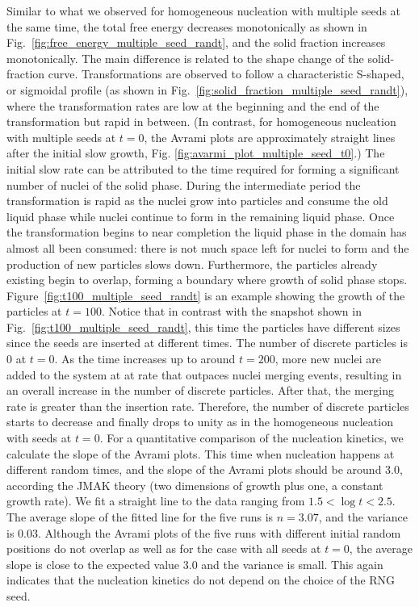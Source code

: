 \documentclass[preprint,12pt]{elsarticle}
\begin{document}
Similar to what we observed for homogeneous nucleation with multiple seeds at the same time, the total free energy decreases monotonically as shown in Fig.~\ref{fig:free_energy_multiple_seed_randt}, and the solid fraction increases monotonically. The main difference %
is related to the shape change of the solid-fraction curve. Transformations are observed to follow a characteristic S-shaped, or sigmoidal profile (as shown in  Fig.~\ref{fig:solid_fraction_multiple_seed_randt}), where the transformation rates are low at the beginning and the end of the transformation but rapid in between. (In contrast, for homogeneous nucleation with multiple seeds at $t=0$, the Avrami plots are approximately straight lines after the initial slow growth, Fig. \ref{fig:avarmi_plot_multiple_seed_t0}.) The initial slow rate can be attributed to the time required for forming a significant number of nuclei of the solid phase. During the intermediate period the transformation is rapid as the nuclei grow into particles and consume the old liquid phase while nuclei continue to form in the remaining liquid phase. Once the transformation begins to near completion the liquid phase in the domain has almost all been consumed: there is not much space left for nuclei to form and the production of new particles slows down. Furthermore, the particles already existing begin to overlap, forming a boundary where growth of solid phase stops. Figure~\ref{fig:t100_multiple_seed_randt} is an example showing the growth of the particles at $t=100$. Notice that in contrast with the snapshot shown in Fig.~\ref{fig:t100_multiple_seed_randt}, this time the particles have different sizes since the seeds are inserted at different times. %
The number of discrete particles is 0 at $t=0$. As the time increases up to around $t=200$, more new nuclei are added to the system at at rate that outpaces nuclei merging events, resulting in an overall increase in the number of discrete particles. After that, the merging rate is greater than the insertion rate. Therefore, the number of discrete particles starts to decrease and finally drops to unity as in the homogeneous nucleation with seeds at $t=0$. For a quantitative comparison of the nucleation kinetics, we calculate the slope of the Avrami plots. This time when nucleation happens at different random times, and the slope of the Avrami plots should be around 3.0, according the JMAK theory (two dimensions of growth plus one, a constant growth rate). We fit a straight line to the data ranging from $1.5 < \log t < 2.5$. The average slope of the fitted line for the five runs is $n=3.07$, and the variance is $0.03$.  Although the Avrami plots of the five runs with different initial random positions do not overlap as well as for the case with all seeds at $t=0$, the average slope is close to the expected value 3.0 and the variance is small.  This again indicates that the nucleation kinetics do not depend on the choice of the RNG seed. 
\end{document}
